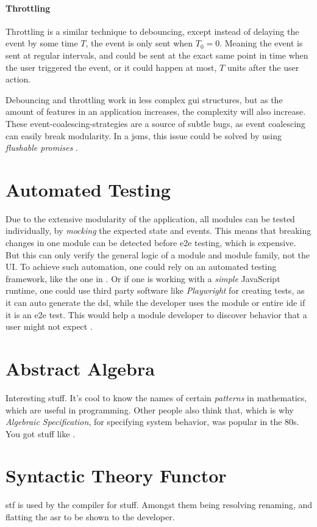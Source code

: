 \paragraph{Throttling} Throttling is a similar technique to debouncing, except
instead of delaying the event by some time $T$, the event is only sent when
$T_0 = 0$. Meaning the event is sent at regular intervals, and could be sent at
the exact same point in time when the user triggered the event, or it could
happen at most, $T$ units after the user action.

Debouncing and throttling work in less complex \gls{gui} structures, but as the
amount of features in an application increases, the complexity will also
increase. These event-coalescing-strategies are a source of subtle bugs, as
event coalescing can easily break modularity. In a \gls{jsms}, this issue could
be solved by using \textit{flushable promises} \cite{flush}.


\section{Automated Testing}
Due to the extensive modularity of the application, all modules can be tested
individually, by \textit{mocking} the expected state and events. This means that
breaking changes in one module can be detected before \gls{e2e} testing, which
is expensive.  But this can only verify the general logic of a
module and module family, not the UI. To achieve such automation, one could rely
on an automated testing framework, like the one in \cite{autoUi}. Or if one is
working with a \textit{simple} JavaScript runtime, one could use third party
software like \textit{Playwright} for creating tests, as it can auto generate
the \gls{dsl}, while the developer uses the module or entire \gls{ide} if it is
an \gls{e2e} test. This would help a module developer to discover behavior that
a user might not expect \cite{leastGui}.


\section{Abstract Algebra}

Interesting stuff. It's cool to know the names of certain \textit{patterns} in
mathematics, which are useful in programming. Other people also think that,
which is why \textit{Algebraic Specification}, for specifying system behavior,
was popular in the 80s. You got stuff like \cite{cafeObj}.


\section{Syntactic Theory Functor}

\gls{stf} is used by the compiler \cite{wig} for stuff. Amongst them being
resolving renaming, and flatting the \gls{asr} to be shown to the developer.
